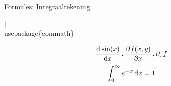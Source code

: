 \documentclass[presentatie.tex]{subfiles}
\begin{document}

\begin{frame}
	{Formules: Integraalrekening}

	\hll|\\usepackage\{commath\}|


	\begin{align*}
		\dod{\sin(x)}{x}, \dpd{f(x,y)}{x}, \partial_x f
	\end{align*}
	\begin{align*}
		\int_{0}^{\infty}e^{-x}\dif x = 1
	\end{align*}
\end{frame}



	

	

	
	
\end{document}
